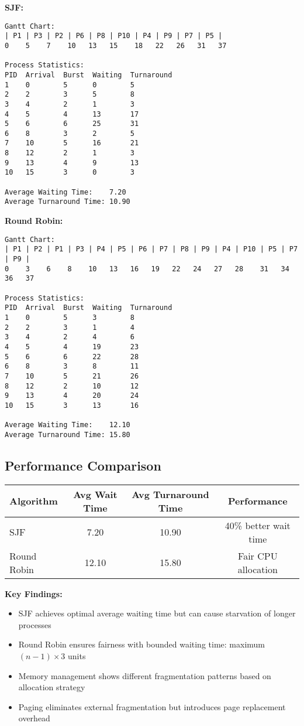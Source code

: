 \documentclass[12pt]{article}
\begin{document}
\textbf{SJF:}
\begin{verbatim}
Gantt Chart:
| P1 | P3 | P2 | P6 | P8 | P10 | P4 | P9 | P7 | P5 |
0    5    7    10   13   15    18   22   26   31   37

Process Statistics:
PID  Arrival  Burst  Waiting  Turnaround
1    0        5      0        5
2    2        3      5        8
3    4        2      1        3
4    5        4      13       17
5    6        6      25       31
6    8        3      2        5
7    10       5      16       21
8    12       2      1        3
9    13       4      9        13
10   15       3      0        3

Average Waiting Time:    7.20
Average Turnaround Time: 10.90
\end{verbatim}
\newpage
\textbf{Round Robin:}
\begin{verbatim}
Gantt Chart:
| P1 | P2 | P1 | P3 | P4 | P5 | P6 | P7 | P8 | P9 | P4 | P10 | P5 | P7 | P9 |
0    3    6    8    10   13   16   19   22   24   27   28    31   34   36   37

Process Statistics:
PID  Arrival  Burst  Waiting  Turnaround
1    0        5      3        8
2    2        3      1        4
3    4        2      4        6
4    5        4      19       23
5    6        6      22       28
6    8        3      8        11
7    10       5      21       26
8    12       2      10       12
9    13       4      20       24
10   15       3      13       16

Average Waiting Time:    12.10
Average Turnaround Time: 15.80
\end{verbatim}

\subsection{Performance Comparison}

\begin{center}
\begin{tabular}{|l|c|c|c|}
\hline
\textbf{Algorithm} & \textbf{Avg Wait Time} & \textbf{Avg Turnaround Time} & \textbf{Performance} \\
\hline
SJF & 7.20 & 10.90 & 40\% better wait time \\
Round Robin & 12.10 & 15.80 & Fair CPU allocation \\
\hline
\end{tabular}
\end{center}

\textbf{Key Findings:}
\begin{itemize}
    \item SJF achieves optimal average waiting time but can cause starvation of longer processes
    \item Round Robin ensures fairness with bounded waiting time: maximum $(n-1) \times 3$ units
    \item Memory management shows different fragmentation patterns based on allocation strategy
    \item Paging eliminates external fragmentation but introduces page replacement overhead
\end{itemize}
\end{document}

